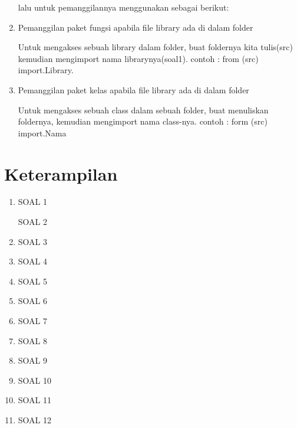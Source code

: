 \documentclass{article}
\begin{document}
\begin{enumerate}

lalu untuk pemanggilannya menggunakan sebagai berikut:

\item  Pemanggilan paket fungsi apabila ﬁle library ada di dalam folder
\par Untuk mengakses sebuah library dalam folder, buat foldernya kita tulis(src) kemudian mengimport nama librarynya(soal1). contoh : from (src) import.Library.
\item Pemanggilan paket kelas apabila ﬁle library ada di dalam folder
\par Untuk mengakses sebuah class dalam sebuah folder, buat menuliskan foldernya, kemudian mengimport nama class-nya. contoh : form (src) import.Nama
\end{enumerate}
\section{Keterampilan}
\begin{enumerate}
\item SOAL 1

\Item SOAL 2

\item SOAL 3

\item SOAL 4

\item SOAL 5

\item SOAL 6

\item SOAL 7

\item SOAL 8

\item SOAL 9

\item SOAL 10

\item SOAL 11

\item SOAL 12


\end{enumerate}
\end{document}
